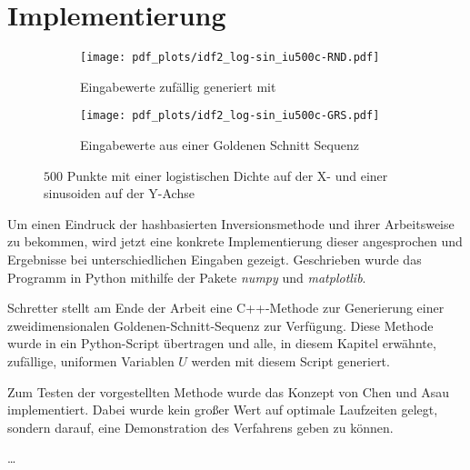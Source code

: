 \section{Implementierung}
\label{impl}
\begin{figure*}[htb!]
    \centering
    \begin{subfigure}[b]{.3\textwidth}
        \centering
        \texttt{[image: pdf\_plots/idf2\_log-sin\_iu500c-RND.pdf]}
        \caption{Eingabewerte zufällig generiert mit }
        \label{fig:logsin_random}
    \end{subfigure}
    \hfill
    \begin{subfigure}[b]{.3\textwidth}
        \centering
        \texttt{[image: pdf\_plots/idf2\_log-sin\_iu500c-GRS.pdf]}
        \caption{Eingabewerte aus einer Goldenen Schnitt Sequenz}
        \label{fig:logsin_uniform}
    \end{subfigure}
    \caption{$500$ Punkte mit einer logistischen Dichte auf der X- und einer sinusoiden auf der Y-Achse}
    \label{fig:rand_vs_uniform}
\end{figure*}


Um einen Eindruck der hashbasierten Inversionsmethode und ihrer Arbeitsweise zu bekommen, 
wird jetzt eine konkrete Implementierung dieser angesprochen und Ergebnisse bei 
unterschiedlichen Eingaben gezeigt. Geschrieben wurde das Programm in Python mithilfe der 
Pakete \textit{numpy} und \textit{matplotlib}.

Schretter \cite{schretter-golden_ratio_sequences-2012} stellt am Ende der Arbeit eine 
C++-Methode zur Generierung einer zweidimensionalen Goldenen-Schnitt-Sequenz zur Verfügung. 
Diese Methode wurde in ein Python-Script übertragen und alle, in diesem Kapitel erwähnte, zufällige, uniformen
Variablen $U$ werden mit diesem Script generiert.

Zum Testen der vorgestellten Methode wurde das Konzept von Chen und Asau \cite{chen_asau-generating_random_variates-1974} 
implementiert. Dabei wurde kein großer Wert auf optimale Laufzeiten gelegt, sondern darauf, eine Demonstration 
des Verfahrens geben zu können.

\dots


